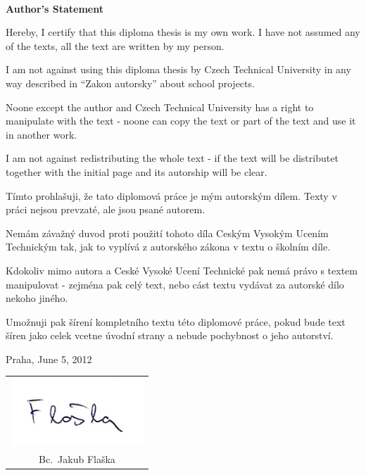 \documentclass[a4paper,12pt]{report}	%
\newcommand{\autor}{Bc.~Jakub Flaška}
\begin{document}
 

\newpage
\tableofcontents


\newpage
\thispagestyle{empty} 

 

\newpage
\thispagestyle{empty}

~
\vfill %

{\bf Author's Statement}

\vspace{0.5cm} %

Hereby, I certify that this diploma thesis is my own work. I have not assumed any of the texts, all the text are written by my person. 

I am not against using this diploma thesis by Czech Technical University in any way described in ``Zakon autorsky'' about school projects.

Noone except the author and Czech Technical University has a right to manipulate with the text - noone can copy the text or part of the text and use it in another work.

I am not against redistributing the whole text - if the text will be distributet together with the initial page and its autorship will be clear.

\vspace{10mm}

Tímto prohlašuji, že tato diplomová práce je mým autorským dílem. Texty v práci nejsou prevzaté, ale jsou psané autorem.

Nemám závažný duvod proti použití tohoto díla Ceským Vysokým Ucením Technickým tak, jak to vyplívá z autorského zákona v textu o školním díle. 

Kdokoliv mimo autora a Ceské Vysoké Ucení Technické pak nemá právo s textem manipulovat - zejména pak celý text, nebo cást textu vydávat za autorské dílo nekoho jiného.

Umožnuji pak šírení kompletního textu této diplomové práce, pokud bude text šíren jako celek vcetne úvodní strany a nebude pochybnost o jeho autorství. 

\vspace{10mm}Praha, June 5, 2012\hfill
	\begin{tabular}{c}
	\includegraphics[width=50mm]{Text/IMG/podpis.jpg}\\ 
	\autor
	\end{tabular}
\end{document}
